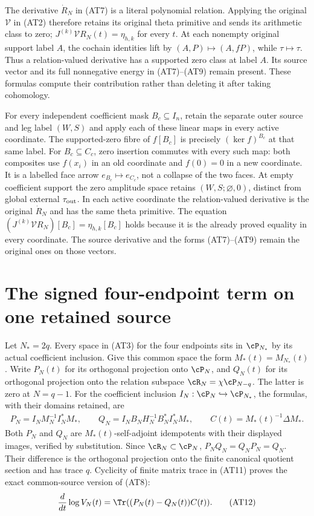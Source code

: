 The derivative $\dot R_N$ in (AT7) is a literal polynomial relation.
Applying the original $\mathcal V$ in (AT2) therefore retains its
original theta primitive and sends its arithmetic class to zero;
$J^{(k)}\mathcal V R_N(t)=\eta_{h,k}$ for every $t$.
At each nonempty original support label $A$, the cochain identities
lift by $(A,P)\mapsto(A,fP)$, while $\tau\mapsto\tau$.
Thus a relation-valued derivative has a supported zero class at
label $A$. Its source vector and its full nonnegative energy in
(AT7)--(AT9) remain present. These formulas compute their
contribution rather than deleting it after taking cohomology.

For every independent coefficient mask $B_c\subseteq I_n$, retain
the separate outer source and leg label $(W,S)$ and apply each of
these linear maps in every active coordinate. The supported-zero
fibre of $f[B_c]$ is precisely $(\ker f)^{B_c}$ at that same label.
For $B_c\subseteq C_c$, zero insertion commutes with every such
map: both composites use $f(x_i)$ in an old coordinate and $f(0)=0$
in a new coordinate. It is a labelled face arrow $e_{B_c}\mapsto
e_{C_c}$, not a collapse of the two faces. At empty coefficient
support the zero amplitude space retains $(W,S;\varnothing,0)$,
distinct from global external $\tau_{\rm out}$.
In each active coordinate the relation-valued derivative
is the original $\dot R_N$ and has the same theta primitive.
The equation $(J^{(k)}\mathcal V R_N)[B_c]=\eta_{h,k}[B_c]$
holds because it is the already proved equality in every coordinate.
The source derivative and the forms (AT7)--(AT9) remain the original
ones on those vectors.

\section{The signed four-endpoint term on one retained source}

Let $N_*=2q$. Every space in (AT3) for the four endpoints sits in
$\cP_{N_*}$ by its actual coefficient inclusion. Give this common
space the form $M_*(t)=M_{N_*}(t)$. Write $P_N(t)$ for its
orthogonal projection onto $\cP_N$, and $Q_N(t)$ for its
orthogonal projection onto the relation subspace
$\cR_N=\chi\cP_{N-q}$. The latter is zero at $N=q-1$.
For the coefficient inclusion $I_N:\cP_N\hookrightarrow\cP_{N_*}$,
the formulas, with their domains retained, are
\[
 \begin{gathered}
 P_N=I_NM_N^{-1}I_N^*M_*,\qquad
 Q_N=I_NB_NH_N^{-1}B_N^*I_N^*M_*,\qquad
 C(t)=M_*(t)^{-1}\Delta M_*.                   \end{gathered}
 \tag{AT11}
\]
Both $P_N$ and $Q_N$ are $M_*(t)$-self-adjoint idempotents with
their displayed images, verified by substitution. Since
$\cR_N\subset\cP_N$, $P_NQ_N=Q_NP_N=Q_N$. Their difference is
the orthogonal projection onto the finite canonical quotient
section and has trace $q$. Cyclicity of finite matrix trace in
(AT11) proves the exact common-source version of (AT8):
\[
 \frac{d}{dt}\log V_N(t)=\Tr((P_N(t)-Q_N(t))C(t)).
                                                        \tag{AT12}
\]

